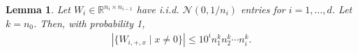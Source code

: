 \documentclass[11pt]{article}
\newtheorem{lemma}[theorem]{Lemma}
\newcommand{\R}{\mathbb{R}}
\newcommand{\calN}{\mathcal{N}}
\newcommand{\Aplus}[1]{A_{+, #1}}
\newcommand{\Apx}{\Aplus{x}}
\newcommand{\ai}{a_i}
\newcommand{\Bpx}{B_{+, x}}
\newcommand{\Boox}{B_{0, x}}
\newcommand{\Wipx}{W_{i, +, x}}
\begin{document}
\begin{lemma} \label{lemma:num-apx-aox-bpx-box} 
Let $W_i \in \R^{n_i \times n_{i-1}}$ have i.i.d. $\calN(0, 1/n_i)$ entries for $i = 1,\ldots,d$.  Let $k = n_0$.   Then, with probability 1,
\begin{align}
| \{ \Wipx \mid x \neq 0\} | \leq 10^i n_1^k n_2^k \cdots n_i^k. %
\end{align}

\end{lemma}
\end{document}
